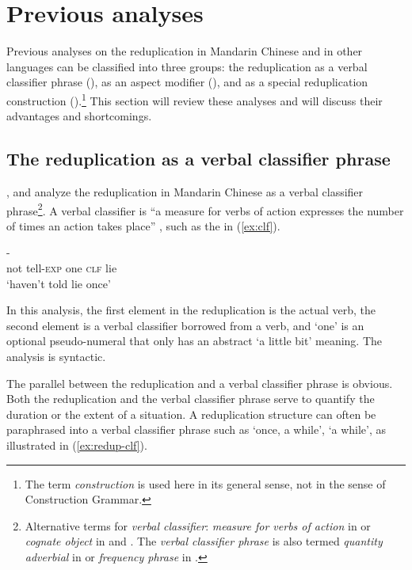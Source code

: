 \section{Previous analyses}\label{sec:prev}

Previous analyses on the reduplication in Mandarin Chinese and in other languages can be classified
into three groups:  the reduplication as a verbal classifier phrase (), as an aspect modifier (), and
as a special reduplication construction ().\footnote{The term \textit{construction} is used here in its general sense, not in the sense of Construction Grammar.} 
This section will review these analyses and will discuss their advantages and shortcomings.



\subsection{The reduplication as a verbal classifier phrase}\label{sec:clf}

\citet{Fan1964}, \citet[205]{Chao1968} and \citet{Xiong2016} analyze the reduplication in Mandarin Chinese
as a verbal classifier phrase\footnote{Alternative terms for \textit{verbal classifier}: \textit{measure for verbs of action} in \citet[615]{Chao1968} or \textit{cognate object} in \citet[312]{Chao1968} and  \citet[263]{Hong1999}.
The \textit{verbal classifier phrase}  is also termed \textit{quantity adverbial} in \citet[352--353]{LiThompson1981} or \textit{frequency phrase} in \citet[91]{Huangetal2009}.}.
A verbal classifier is ``a measure for verbs of action expresses the number of times an action takes place” \citep[615]{Chao1968}, such as the  in (\ref{ex:clf}). 

\ea\label{ex:clf}
\gll {} -   \\
not tell-\textsc{exp} one \textsc{clf} lie\\ \hfill {\citep[616]{Chao1968}}
\glt `haven't told lie once'
\z

In this analysis, the first element in the reduplication is the actual verb, 
the second element is a verbal classifier borrowed from a verb, 
and  `one' is an optional pseudo-numeral that only has an abstract `a little bit' meaning.
The analysis is syntactic.

The parallel between the reduplication and a verbal classifier phrase is obvious. 
Both the reduplication and the verbal classifier phrase serve to quantify the duration or the extent of a situation. 
A reduplication structure can often be paraphrased into a verbal classifier phrase such as   `once, a while',   `a while', as illustrated in (\ref{ex:redup-clf}).


